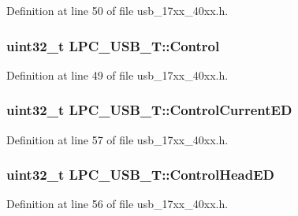 Definition at line 50 of file usb\+\_\+17xx\+\_\+40xx.\+h.

\subsubsection[{\texorpdfstring{Control}{Control}}]{ uint32\+\_\+t L\+P\+C\+\_\+\+U\+S\+B\+\_\+\+T\+::\+Control}\hypertarget{structLPC__USB__T_a01563d891695a6ebce006b7e9a97d631}{}\label{structLPC__USB__T_a01563d891695a6ebce006b7e9a97d631}


Definition at line 49 of file usb\+\_\+17xx\+\_\+40xx.\+h.

\subsubsection[{\texorpdfstring{Control\+Current\+ED}{ControlCurrentED}}]{ uint32\+\_\+t L\+P\+C\+\_\+\+U\+S\+B\+\_\+\+T\+::\+Control\+Current\+ED}\hypertarget{structLPC__USB__T_a40b31e4355ff8375370399822e69234d}{}\label{structLPC__USB__T_a40b31e4355ff8375370399822e69234d}


Definition at line 57 of file usb\+\_\+17xx\+\_\+40xx.\+h.

\subsubsection[{\texorpdfstring{Control\+Head\+ED}{ControlHeadED}}]{ uint32\+\_\+t L\+P\+C\+\_\+\+U\+S\+B\+\_\+\+T\+::\+Control\+Head\+ED}\hypertarget{structLPC__USB__T_a77aa3ddd7247b6a86716a9f21276ac84}{}\label{structLPC__USB__T_a77aa3ddd7247b6a86716a9f21276ac84}


Definition at line 56 of file usb\+\_\+17xx\+\_\+40xx.\+h.

